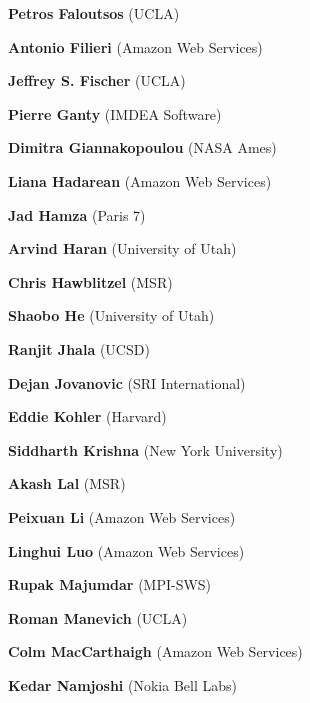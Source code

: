 \documentclass{article}
\begin{document}
\begin{commalist}
    \item {\bf Petros Faloutsos} (UCLA)


    \item {\bf Antonio Filieri} (Amazon Web Services)


    \item {\bf Jeffrey S. Fischer} (UCLA)


    \item {\bf Pierre Ganty} (IMDEA Software)


    \item {\bf Dimitra Giannakopoulou} (NASA Ames)


    \item {\bf Liana Hadarean} (Amazon Web Services)


    \item {\bf Jad Hamza} (Paris 7)


    \item {\bf Arvind Haran} (University of Utah)


    \item {\bf Chris Hawblitzel} (MSR)


    \item {\bf Shaobo He} (University of Utah)


    \item {\bf Ranjit Jhala} (UCSD)


    \item {\bf Dejan Jovanovic} (SRI International)


    \item {\bf Eddie Kohler} (Harvard)


    \item {\bf Siddharth Krishna} (New York University)


    \item {\bf Akash Lal} (MSR)


    \item {\bf Peixuan Li} (Amazon Web Services)


    \item {\bf Linghui Luo} (Amazon Web Services)


    \item {\bf Rupak Majumdar} (MPI-SWS)


    \item {\bf Roman Manevich} (UCLA)


    \item {\bf Colm MacCarthaigh} (Amazon Web Services)


    \item {\bf Kedar Namjoshi} (Nokia Bell Labs)



\end{commalist}
\end{document}
